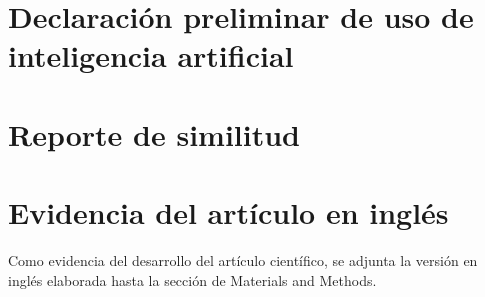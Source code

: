 \appendix

\section{Declaración preliminar de uso de inteligencia artificial}


\section{Reporte de similitud}


\section{Evidencia del artículo en inglés}
Como evidencia del desarrollo del artículo científico, se adjunta la versión en inglés elaborada hasta la sección de Materials and Methods.

%

